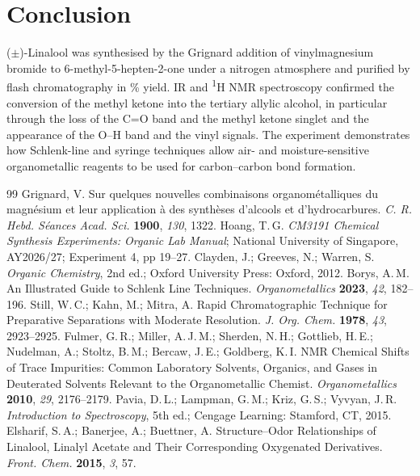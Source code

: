 \documentclass[11pt,a4paper]{article}
\begin{document}
\section{Conclusion}
($\pm$)-Linalool was synthesised by the Grignard addition of vinylmagnesium bromide to 6-methyl-5-hepten-2-one under a nitrogen atmosphere and purified by flash chromatography in \% yield. IR and \textsuperscript{1}H NMR spectroscopy confirmed the conversion of the methyl ketone into the tertiary allylic alcohol, in particular through the loss of the C=O band and the methyl ketone singlet and the appearance of the O--H band and the vinyl signals. The experiment demonstrates how Schlenk-line and syringe techniques allow air- and moisture-sensitive organometallic reagents to be used for carbon--carbon bond formation.

\begin{thebibliography}{99}
\small
\setlength{\itemsep}{1pt}
 Grignard, V. Sur quelques nouvelles combinaisons organométalliques du magnésium et leur application à des synthèses d'alcools et d'hydrocarbures. \emph{C. R. Hebd. Séances Acad. Sci.} \textbf{1900}, \emph{130}, 1322.
 Hoang, T.\,G. \emph{CM3191 Chemical Synthesis Experiments: Organic Lab Manual}; National University of Singapore, AY2026/27; Experiment 4, pp 19--27.
 Clayden, J.; Greeves, N.; Warren, S. \emph{Organic Chemistry}, 2nd ed.; Oxford University Press: Oxford, 2012.
 Borys, A.\,M. An Illustrated Guide to Schlenk Line Techniques. \emph{Organometallics} \textbf{2023}, \emph{42}, 182--196.
 Still, W.\,C.; Kahn, M.; Mitra, A. Rapid Chromatographic Technique for Preparative Separations with Moderate Resolution. \emph{J. Org. Chem.} \textbf{1978}, \emph{43}, 2923--2925.
 Fulmer, G.\,R.; Miller, A.\,J.\,M.; Sherden, N.\,H.; Gottlieb, H.\,E.; Nudelman, A.; Stoltz, B.\,M.; Bercaw, J.\,E.; Goldberg, K.\,I. NMR Chemical Shifts of Trace Impurities: Common Laboratory Solvents, Organics, and Gases in Deuterated Solvents Relevant to the Organometallic Chemist. \emph{Organometallics} \textbf{2010}, \emph{29}, 2176--2179.
 Pavia, D.\,L.; Lampman, G.\,M.; Kriz, G.\,S.; Vyvyan, J.\,R. \emph{Introduction to Spectroscopy}, 5th ed.; Cengage Learning: Stamford, CT, 2015.
 Elsharif, S.\,A.; Banerjee, A.; Buettner, A. Structure--Odor Relationships of Linalool, Linalyl Acetate and Their Corresponding Oxygenated Derivatives. \emph{Front. Chem.} \textbf{2015}, \emph{3}, 57.
\end{thebibliography}
\end{document}
